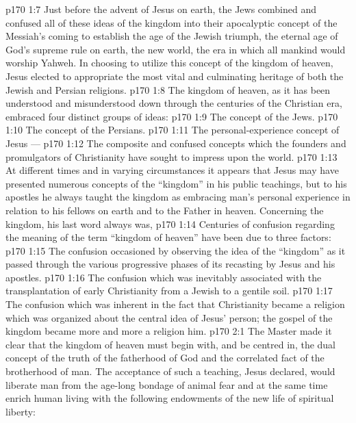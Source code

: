 \vs p170 1:7 \pc Just before the advent of Jesus on earth, the Jews combined and confused all of these ideas of the kingdom into their apocalyptic concept of the Messiah’s coming to establish the age of the Jewish triumph, the eternal age of God’s supreme rule on earth, the new world, the era in which all mankind would worship Yahweh. In choosing to utilize this concept of the kingdom of heaven, Jesus elected to appropriate the most vital and culminating heritage of both the Jewish and Persian religions.
\vs p170 1:8 The kingdom of heaven, as it has been understood and misunderstood down through the centuries of the Christian era, embraced four distinct groups of ideas:
\vs p170 1:9 \bibnobreakspace The concept of the Jews.
\vs p170 1:10 \bibnobreakspace The concept of the Persians.
\vs p170 1:11 \bibnobreakspace The personal\hyp{}experience concept of Jesus --- 
\vs p170 1:12 \bibnobreakspace The composite and confused concepts which the founders and promulgators of Christianity have sought to impress upon the world.
\vs p170 1:13 \pc At different times and in varying circumstances it appears that Jesus may have presented numerous concepts of the “kingdom” in his public teachings, but to his apostles he always taught the kingdom as embracing man’s personal experience in relation to his fellows on earth and to the Father in heaven. Concerning the kingdom, his last word always was, 
\vs p170 1:14 Centuries of confusion regarding the meaning of the term “kingdom of heaven” have been due to three factors:
\vs p170 1:15 \bibnobreakspace The confusion occasioned by observing the idea of the “kingdom” as it passed through the various progressive phases of its recasting by Jesus and his apostles.
\vs p170 1:16 \bibnobreakspace The confusion which was inevitably associated with the transplantation of early Christianity from a Jewish to a gentile soil.
\vs p170 1:17 \bibnobreakspace The confusion which was inherent in the fact that Christianity became a religion which was organized about the central idea of Jesus’ person; the gospel of the kingdom became more and more a religion  him.
\vs p170 2:1 The Master made it clear that the kingdom of heaven must begin with, and be centred in, the dual concept of the truth of the fatherhood of God and the correlated fact of the brotherhood of man. The acceptance of such a teaching, Jesus declared, would liberate man from the age\hyp{}long bondage of animal fear and at the same time enrich human living with the following endowments of the new life of spiritual liberty:

